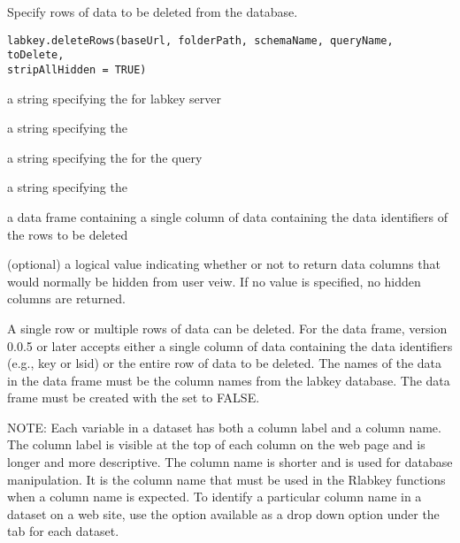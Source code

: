 \documentclass{book}
\begin{document}
\begin{Description}\relax
Specify rows of data to be deleted from the database.
\end{Description}
\begin{Usage}
\begin{verbatim}
labkey.deleteRows(baseUrl, folderPath, schemaName, queryName, toDelete, 
stripAllHidden = TRUE)
\end{verbatim}
\end{Usage}
\begin{Arguments}
\begin{ldescription}
\item[\code{baseUrl}] a string specifying the for labkey server
\item[\code{folderPath}] a string specifying the 
\item[\code{schemaName}] a string specifying the   for the query
\item[\code{queryName}] a string specifying the  
\item[\code{toDelete}] a data frame containing a single column of data containing the data identifiers of the rows to be deleted
\item[\code{stripAllHidden}] (optional) a logical value indicating whether or not to return data columns that would 
normally be hidden from user veiw. If no value is specified, no hidden columns are returned.
\end{ldescription}
\end{Arguments}
\begin{Details}\relax
A single row or multiple rows of data can be deleted.  For the  data frame, version 0.0.5 or later accepts either a single column 
of data containing the data identifiers  (e.g., key or lsid) or the entire row of data to be deleted.
The names of the data in the data frame must be the column names from the labkey database.
The data frame must be created with the  set to FALSE.

NOTE: Each variable in a dataset has both a column label and a column name. The column label is visible at the top
of each column on the web page and is longer and more descriptive. The column name is shorter and is 
used  for database manipulation. It is the column name that must be used in
the Rlabkey functions when a column name is expected. To identify a particular column name in a dataset on
a web site, use the  option available as a drop down option under the  
tab for each dataset.
\end{Details}
\end{document}
